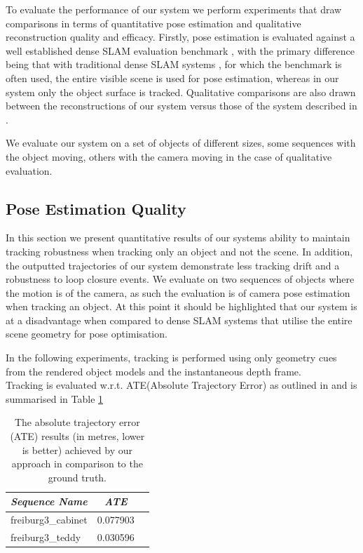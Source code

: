 To evaluate the performance of our system we perform experiments that draw comparisons in terms of quantitative pose estimation and qualitative reconstruction quality and efficacy.
Firstly, pose estimation is evaluated against a well established dense SLAM evaluation benchmark \cite{sturm12iros}, with the primary difference being that with traditional dense SLAM 
systems \cite{Prisacariu2014,Niessner2013,Newcombe2011}, for which the benchmark is often used, the entire visible scene is used for pose estimation, whereas in our system only the object 
surface is tracked. Qualitative comparisons are also drawn between the reconstructions of our system versus those of the system described in \cite{Ren2013}.

We evaluate our system on a set of objects of different sizes, some sequences with the object moving, others with the camera moving in the case of qualitative evaluation. 

\subsection{Pose Estimation Quality}
In this section we present quantitative results of our systems ability to maintain tracking robustness when tracking only an object and not the scene. In addition, the outputted trajectories 
of our system demonstrate less tracking drift and a robustness to loop closure events. We evaluate on two sequences of objects where the motion is of the camera, as such the evaluation is of 
camera pose estimation when tracking an object. At this point it should be highlighted that our system is at a disadvantage when compared to dense SLAM systems that utilise the entire scene 
geometry for pose optimisation.

In the following experiments, tracking is performed using only geometry cues from the rendered object models and the instantaneous depth frame.\\

Tracking is evaluated w.r.t. ATE(Absolute Trajectory Error) as outlined in \cite{sturm12iros} and is summarised in Table \ref{ateTable}
\begin{table}[!t]
	{
        \footnotesize
		\begin{center}
			\begin{tabular}{l@{\hskip 1cm} c c}
				\emph{Sequence Name} & \emph{ATE}\\
				\midrule
				\textsf{freiburg3\_cabinet} & 0.077903\\
				\textsf{freiburg3\_teddy} & 0.030596\\
			\end{tabular}
		\end{center}
	}
	\caption{The absolute trajectory error (ATE) results (in metres, lower is better) achieved by our approach in comparison to the ground truth.}
	\label{ateTable}
\end{table}

